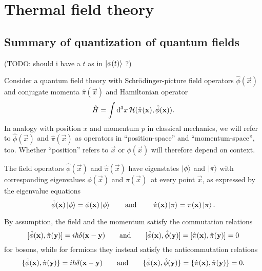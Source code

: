 \chapter{Thermal field theory}

\newcommand{\transampl}{\braket{\phi_B | e^{- i \hat{H} T} | \phi_A}}

\section{Summary of quantization of quantum fields}

(TODO: should i have a $t$ as in $\ket{\phi(t)}$ ?)

Consider a quantum field theory with Schrödinger-picture field operators $\hat{\phi}(\vec{x})$ and conjugate momenta $\hat{\pi}(\vec{x})$ and Hamiltonian operator
\begin{equation}
	\hat{H} = \int \mathop{}\!\mathrm{d}^3 x \, \mathcal{H}(\hat{\pi}(\mathbf{x}), \hat{\phi}(\mathbf{x})) .
\end{equation}
In analogy with position $x$ and momentum $p$ in classical mechanics, we will refer to $\hat\phi(\vec{x})$ and $\hat\pi(\vec{x})$ as operators in ``position-space'' and ``momentum-space'', too.
Whether ``position'' refers to $\vec{x}$ or $\phi(\vec{x})$ will therefore depend on context.

The field operators $\hat{\phi}(\vec{x})$ and $\hat{\pi}(\vec{x})$ have eigenstates $\ket{\phi}$ and $\ket{\pi}$ with corresponding eigenvalues $\phi(\vec{x})$ and $\pi(\vec{x})$ at every point $\vec{x}$, as expressed by the eigenvalue equations
\begin{equation}
	\hat{\phi}(\vec{x}) \ket{\phi} = \phi(\vec{x}) \ket{\phi}
	\qquad \text{and} \qquad
	\hat{\pi}(\vec{x}) \ket{\pi} = \pi(\vec{x}) \ket{\pi} .
\label{eq:tft:field_eigenvalue_equations}
\end{equation}

By assumption, the field and the momentum satisfy the commutation relations
\begin{equation}
	[ \hat{\phi}(\mathbf{x}) , \hat{\pi}(\mathbf{y}) ] = i \hbar \delta(\mathbf{x} - \mathbf{y})
	\qquad \text{and} \qquad
	[ \hat{\phi}(\mathbf{x}) , \hat{\phi}(\mathbf{y}) ] = 
	[ \hat{\pi}(\mathbf{x}) , \hat{\pi}(\mathbf{y)} ] = 
	0
\label{eq:tft:boson_field_commutators}
\end{equation}
for bosons, while for fermions they instead satisfy the anticommutation relations
\begin{equation}
	\{ \hat{\phi}(\mathbf{x}) , \hat{\pi}(\mathbf{y}) \} = i \hbar \delta(\mathbf{x} - \mathbf{y})
	\qquad \text{and} \qquad
	\{ \hat{\phi}(\mathbf{x}) , \hat{\phi}(\mathbf{y}) \} = 
	\{ \hat{\pi}(\mathbf{x}) , \hat{\pi}(\mathbf{y)} \} = 
	0 .
\label{eq:tft:fermion_field_anticommutators}
\end{equation}

